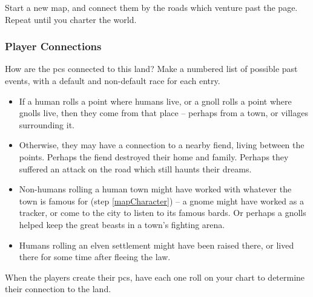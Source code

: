 \begin{multicols}{2}
\begin{itemize}
  Start a new map, and connect them by the roads which venture past the page.
  Repeat until you charter the world.
\end{itemize}

\bigLine

\subsubsection{Player Connections}

How are the \glspl{pc} connected to this land?
Make a numbered list of possible past events, with a default and non-default race for each entry.

\begin{itemize}
  \item
  If a human rolls a point where humans live, or a gnoll rolls a point where gnolls live, then they come from that place -- perhaps from a town, or villages surrounding it.
  \item
  Otherwise, they may have a connection to a nearby fiend, living between the points.
  Perhaps the fiend destroyed their home and family.
  Perhaps they suffered an attack on the road which still haunts their dreams.
  \item
  Non-humans rolling a human town might have worked with whatever the town is famous for (step \ref{mapCharacter}) -- a gnome might have worked as a tracker, or come to the city to listen to its famous bards.
  Or perhaps a gnolls helped keep the great beasts in a town's fighting arena.
  \item
  Humans rolling an elven settlement might have been raised there, or lived there for some time after fleeing the law.
\end{itemize}

When the players create their \glspl{pc}, have each one roll on your chart to determine their connection to the land.


\end{multicols}
